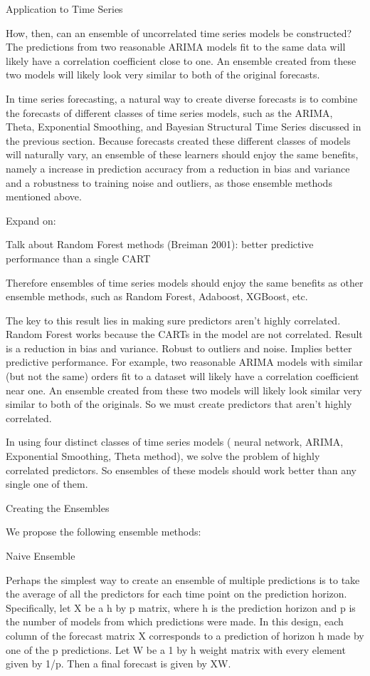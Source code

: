 \documentclass [M] {uclathes}
\begin{document}
Application to Time Series

How, then, can an ensemble of uncorrelated time series models be constructed? The predictions from two reasonable ARIMA models fit to the same data will likely have a correlation coefficient close to one. An ensemble created from these two models will likely look very similar to both of the original forecasts.

In time series forecasting, a natural way to create diverse forecasts is to combine the forecasts of different classes of time series models, such as the ARIMA, Theta, Exponential Smoothing, and Bayesian Structural Time Series discussed in the previous section. Because forecasts created these different classes of models will naturally vary, an ensemble of these learners should enjoy the same benefits, namely a increase in prediction accuracy from a reduction in bias and variance and a robustness to training noise and outliers, as those ensemble methods mentioned above.

Expand on:

Talk about Random Forest methods (Breiman 2001): better predictive performance than a single CART

Therefore ensembles of time series models should enjoy the same benefits as other ensemble methods, such as Random Forest, Adaboost, XGBoost, etc.

The key to this result lies in making sure predictors aren’t highly correlated. Random Forest works because the CARTs in the model are not correlated. Result is a reduction in bias and variance. Robust to outliers and noise. Implies better predictive performance.
For example, two reasonable ARIMA models with similar (but not the same) orders fit to a dataset will likely have a correlation coefficient near one. An ensemble created from these two models will likely look similar very similar to both of the originals. So we must create predictors that aren’t  highly correlated.

In using four distinct classes of time series models ( neural network, ARIMA, Exponential Smoothing, Theta method), we solve the problem of highly correlated predictors. So ensembles of these models should work better than any single one of them.


Creating the Ensembles

We propose the following ensemble methods:

Naive Ensemble

Perhaps the simplest way to create an ensemble of multiple predictions is to take the average of all the predictors for each time point on the prediction horizon. Specifically, let X be a h by p matrix, where h is the prediction horizon and p is the number of models from which predictions were made. In this design, each column of the forecast matrix X corresponds to a prediction of horizon h made by one of the p predictions.  Let W be a 1 by h weight matrix with every element given by 1/p. Then a final forecast is given by XW.
\end{document}
